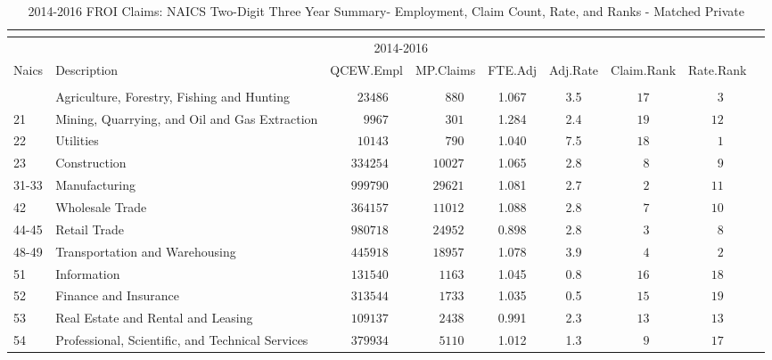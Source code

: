 \documentclass[9pt, oneside]{article}   	%
\begin{document}
\begin{longtable}{lp{3 in}ccccccc}
\caption{2014-2016 FROI Claims: NAICS Two-Digit Three Year Summary- Employment, Claim Count, Rate, and Ranks - Matched Private}\\
\label{Table: 10a.MPc}\\
 \hline
                          \toprule
 & \multicolumn{7}{c}{2014-2016} \\ 
Naics  & Description & QCEW.Empl & MP.Claims & FTE.Adj & Adj.Rate & Claim.Rank & \multicolumn{1}{c}{Rate.Rank} \\ 
\midrule\\ [-1\normalbaselineskip]\hline\endhead\hline\endfoot
11  & Agriculture, Forestry, Fishing and Hunting & $\phantom{00}23486$ & $\phantom{000}880$ & 1.067 & 3.5 & $17$ & $\phantom{0}3$ \\
21  & Mining, Quarrying, and Oil and Gas Extraction & $\phantom{000}9967$ & $\phantom{000}301$ & 1.284 & 2.4 & $19$ & $12$ \\
22  & Utilities & $\phantom{00}10143$ & $\phantom{000}790$ & 1.040 & 7.5 & $18$ & $\phantom{0}1$ \\
23  & Construction & $\phantom{0}334254$ & $\phantom{0}10027$ & 1.065 & 2.8 & $\phantom{0}8$ & $\phantom{0}9$ \\
31-33  & Manufacturing & $\phantom{0}999790$ & $\phantom{0}29621$ & 1.081 & 2.7 & $\phantom{0}2$ & $11$ \\
42  & Wholesale Trade & $\phantom{0}364157$ & $\phantom{0}11012$ & 1.088 & 2.8 & $\phantom{0}7$ & $10$ \\
44-45  & Retail Trade & $\phantom{0}980718$ & $\phantom{0}24952$ & 0.898 & 2.8 & $\phantom{0}3$ & $\phantom{0}8$ \\
48-49  & Transportation and Warehousing & $\phantom{0}445918$ & $\phantom{0}18957$ & 1.078 & 3.9 & $\phantom{0}4$ & $\phantom{0}2$ \\
51  & Information & $\phantom{0}131540$ & $\phantom{00}1163$ & 1.045 & 0.8 & $16$ & $18$ \\
52  & Finance and Insurance & $\phantom{0}313544$ & $\phantom{00}1733$ & 1.035 & 0.5 & $15$ & $19$ \\
53  & Real Estate and Rental and Leasing & $\phantom{0}109137$ & $\phantom{00}2438$ & 0.991 & 2.3 & $13$ & $13$ \\
54  & Professional, Scientific, and Technical Services & $\phantom{0}379934$ & $\phantom{00}5110$ & 1.012 & 1.3 & $\phantom{0}9$ & $17$ \\

\end{longtable}
\end{document}
